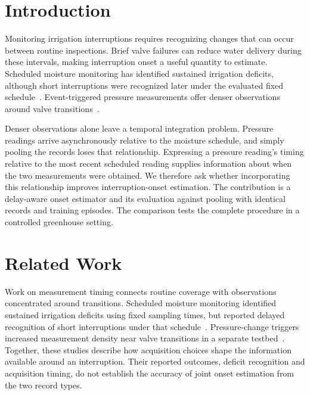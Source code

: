 \begin{abstract}
Brief irrigation interruptions can reduce greenhouse water delivery before routine inspection detects them. Scheduled moisture measurements provide sparse observations near interruption onset, while event-triggered pressure readings add transition information at asynchronous times. The resulting estimation problem requires relating those observations in time. We introduce a delay-aware onset estimator that aligns records to the latest scheduled moisture reading and includes elapsed time in onset estimation. Using identical records and an episode-level split, the estimator achieved a mean absolute onset error of 6.4~s across 12 held-out episodes, compared with 9.1~s for a pooling comparator. These findings support timing-aware integration for onset estimation within the tested laboratory greenhouse.
\end{abstract}

\section{Introduction}
Monitoring irrigation interruptions requires recognizing changes that can occur between routine inspections. Brief valve failures can reduce water delivery during these intervals, making interruption onset a useful quantity to estimate. Scheduled moisture monitoring has identified sustained irrigation deficits, although short interruptions were recognized later under the evaluated fixed schedule~\cite{routine2022}. Event-triggered pressure measurements offer denser observations around valve transitions~\cite{event2023}.

Denser observations alone leave a temporal integration problem. Pressure readings arrive asynchronously relative to the moisture schedule, and simply pooling the records loses that relationship. Expressing a pressure reading's timing relative to the most recent scheduled reading supplies information about when the two measurements were obtained. We therefore ask whether incorporating this relationship improves interruption-onset estimation. The contribution is a delay-aware onset estimator and its evaluation against pooling with identical records and training episodes. The comparison tests the complete procedure in a controlled greenhouse setting.

\section{Related Work}
Work on measurement timing connects routine coverage with observations concentrated around transitions. Scheduled moisture monitoring identified sustained irrigation deficits using fixed sampling times, but reported delayed recognition of short interruptions under that schedule~\cite{routine2022}. Pressure-change triggers increased measurement density near valve transitions in a separate testbed~\cite{event2023}. Together, these studies describe how acquisition choices shape the information available around an interruption. Their reported outcomes, deficit recognition and acquisition timing, do not establish the accuracy of joint onset estimation from the two record types.

